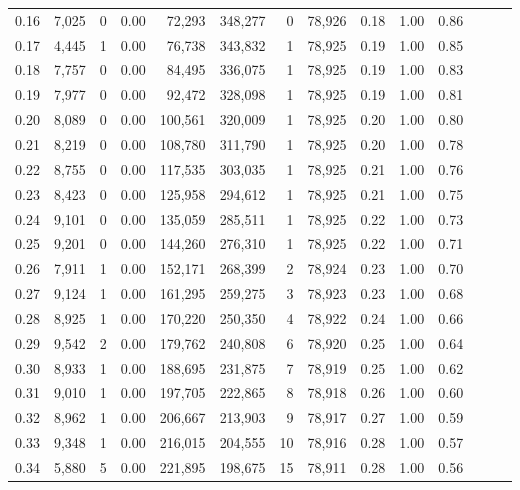 \begin{tabular}{rrrrrrrrrrrrrr}
0.16 &  7,025 &      0 &  0.00 &   72,293 &  348,277 &       0 &  78,926 &  0.18 &  1.00 &      0.86 \\
0.17 &  4,445 &      1 &  0.00 &   76,738 &  343,832 &       1 &  78,925 &  0.19 &  1.00 &      0.85 \\
0.18 &  7,757 &      0 &  0.00 &   84,495 &  336,075 &       1 &  78,925 &  0.19 &  1.00 &      0.83 \\
0.19 &  7,977 &      0 &  0.00 &   92,472 &  328,098 &       1 &  78,925 &  0.19 &  1.00 &      0.81 \\
0.20 &  8,089 &      0 &  0.00 &  100,561 &  320,009 &       1 &  78,925 &  0.20 &  1.00 &      0.80 \\
0.21 &  8,219 &      0 &  0.00 &  108,780 &  311,790 &       1 &  78,925 &  0.20 &  1.00 &      0.78 \\
0.22 &  8,755 &      0 &  0.00 &  117,535 &  303,035 &       1 &  78,925 &  0.21 &  1.00 &      0.76 \\
0.23 &  8,423 &      0 &  0.00 &  125,958 &  294,612 &       1 &  78,925 &  0.21 &  1.00 &      0.75 \\
0.24 &  9,101 &      0 &  0.00 &  135,059 &  285,511 &       1 &  78,925 &  0.22 &  1.00 &      0.73 \\
0.25 &  9,201 &      0 &  0.00 &  144,260 &  276,310 &       1 &  78,925 &  0.22 &  1.00 &      0.71 \\
0.26 &  7,911 &      1 &  0.00 &  152,171 &  268,399 &       2 &  78,924 &  0.23 &  1.00 &      0.70 \\
0.27 &  9,124 &      1 &  0.00 &  161,295 &  259,275 &       3 &  78,923 &  0.23 &  1.00 &      0.68 \\
0.28 &  8,925 &      1 &  0.00 &  170,220 &  250,350 &       4 &  78,922 &  0.24 &  1.00 &      0.66 \\
0.29 &  9,542 &      2 &  0.00 &  179,762 &  240,808 &       6 &  78,920 &  0.25 &  1.00 &      0.64 \\
0.30 &  8,933 &      1 &  0.00 &  188,695 &  231,875 &       7 &  78,919 &  0.25 &  1.00 &      0.62 \\
0.31 &  9,010 &      1 &  0.00 &  197,705 &  222,865 &       8 &  78,918 &  0.26 &  1.00 &      0.60 \\
0.32 &  8,962 &      1 &  0.00 &  206,667 &  213,903 &       9 &  78,917 &  0.27 &  1.00 &      0.59 \\
0.33 &  9,348 &      1 &  0.00 &  216,015 &  204,555 &      10 &  78,916 &  0.28 &  1.00 &      0.57 \\
0.34 &  5,880 &      5 &  0.00 &  221,895 &  198,675 &      15 &  78,911 &  0.28 &  1.00 &      0.56 \\

\end{tabular}

